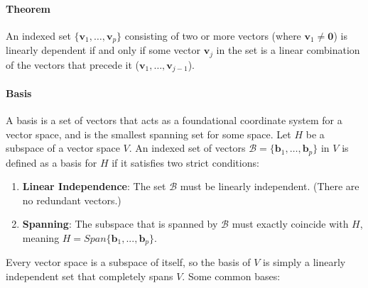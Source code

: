 \documentclass[../linear-algebra.tex]{subfiles}
\begin{document}
\paragraph{Theorem} An indexed set $\{\mathbf{v}_{1},\ldots,\mathbf{v}_{p}\}$ consisting of two or more vectors (where $\mathbf{v}_{1}\ne\mathbf{0}$) is linearly dependent if and only if some vector $\mathbf{v}_{j}$ in the set is a linear combination of the vectors that precede it ($\mathbf{v}_{1},\ldots,\mathbf{v}_{j-1}$).

\paragraph{Basis} A basis is a set of vectors that acts as a foundational coordinate system for a vector space, and is the smallest spanning set for some space.\newline
    Let $H$ be a subspace of a vector space $V$. An indexed set of vectors $\mathcal{B}=\{\mathbf{b}_{1},\ldots,\mathbf{b}_{p}\}$ in $V$ is defined as a basis for $H$ if it satisfies two strict conditions:
\begin{enumerate}
    \item \textbf{Linear Independence}: The set $\mathcal{B}$ must be linearly independent. (There are no redundant vectors.)
    \item \textbf{Spanning}: The subspace that is spanned by $\mathcal{B}$ must exactly coincide with $H$, meaning $H=Span\{\mathbf{b}_{1},...,\mathbf{b}_{p}\}$.
\end{enumerate}
Every vector space is a subspace of itself, so the basis of $V$ is simply a linearly independent set that completely spans $V$.\newline
Some common bases:
\end{document}
